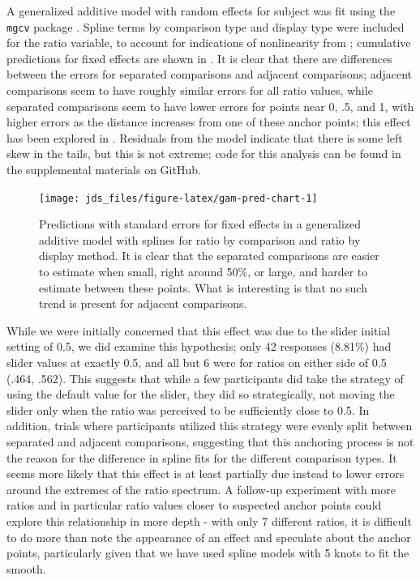 \documentclass[letterpaper,inpress,dvipsnames]{jdsart}
\begin{document}
A generalized additive model with random effects for subject was fit using the \texttt{mgcv} package \citep{mgcv1, mgcv2, mgcv3}. Spline terms by comparison type and display type were included for the ratio variable, to account for indications of nonlinearity from ; cumulative predictions for fixed effects are shown in . It is clear that there are differences between the errors for separated comparisons and adjacent comparisons; adjacent comparisons seem to have roughly similar errors for all ratio values, while separated comparisons seem to have lower errors for points near 0, .5, and 1, with higher errors as the distance increases from one of these anchor points; this effect has been explored in \citet{hollandsBiasProportionJudgments2000}.
Residuals from the model indicate that there is some left skew in the tails, but this is not extreme; code for this analysis can be found in the supplemental materials on GitHub.

\begin{figure}
\texttt{[image: jds\_files/figure-latex/gam-pred-chart-1]} \caption{Predictions with standard errors for fixed effects in a generalized additive model with splines for ratio by comparison and ratio by display method. It is clear that the separated comparisons are easier to estimate when small, right around 50\%, or large, and harder to estimate between these points. What is interesting is that no such trend is present for adjacent comparisons. }\label{fig:gam-pred-chart}
\end{figure}

While we were initially concerned that this effect was due to the slider initial setting of 0.5, we did examine this hypothesis; only 42 responses (8.81\%) had slider values at exactly 0.5, and all but 6 were for ratios on either side of 0.5 (.464, .562). This suggests that while a few participants did take the strategy of using the default value for the slider, they did so strategically, not moving the slider only when the ratio was perceived to be sufficiently close to 0.5. In addition, trials where participants utilized this strategy were evenly split between separated and adjacent comparisons, suggesting that this anchoring process is not the reason for the difference in spline fits for the different comparison types. It seems more likely that this effect is at least partially due instead to lower errors around the extremes of the ratio spectrum. A follow-up experiment with more ratios and in particular ratio values closer to suspected anchor points could explore this relationship in more depth - with only 7 different ratios, it is difficult to do more than note the appearance of an effect and speculate about the anchor points, particularly given that we have used spline models with 5 knots to fit the smooth.
\end{document}
